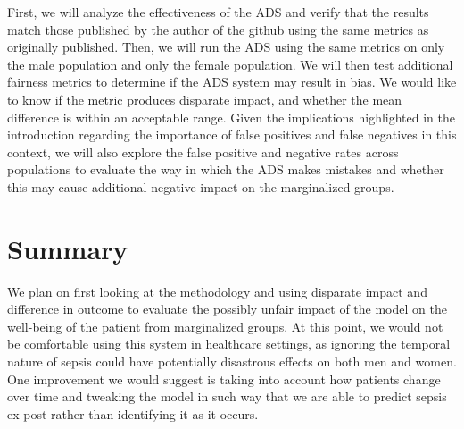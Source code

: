 \documentclass[10pt,letterpaper]{article}
\begin{document}
\par First, we will analyze the effectiveness of the ADS and verify that the results match those published by the author of the github using the same metrics as originally published. Then, we will run the ADS using the same metrics on only the male population and only the female population. We will then test additional fairness metrics to determine if the ADS system may result in bias. We would like to know if the metric produces disparate impact, and whether the mean difference is within an acceptable range. Given the implications highlighted in the introduction regarding the importance of false positives and false negatives in this context, we will also explore the false positive and negative rates across populations to evaluate the way in which the ADS makes mistakes and whether this may cause additional negative impact on the marginalized groups.

\clearpage

\section*{Summary}


\par We plan on first looking at the methodology and using disparate impact and difference in outcome to evaluate the possibly unfair impact of the model on the well-being of the patient from marginalized groups. At this point, we would not be comfortable using this system in healthcare settings, as ignoring the temporal nature of sepsis could have potentially disastrous effects on both men and women. One improvement we would suggest is taking into account how patients change over time and tweaking the model in such way that we are able to predict sepsis ex-post rather than identifying it as it occurs.

\newpage


\end{document}
